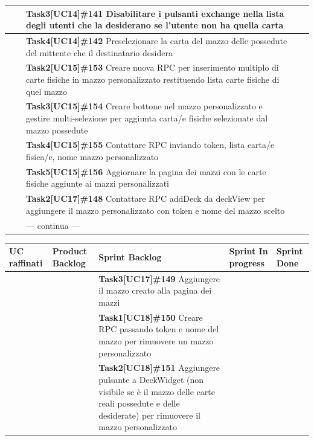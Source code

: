 \documentclass[a4paper, oneside]{article}
\begin{document}
\begin{landscape}
\begin{tabular}{ | p{6.5cm} | p{3cm} | p{8cm} | p{2.9cm} | p{2.4cm}| }
            & & \textbf{Task3[UC14]\#141} Disabilitare i pulsanti exchange nella lista degli utenti che la desiderano se l'utente non ha quella carta  & & \\ \hline
            & & \textbf{Task4[UC14]\#142} Preselezionare la carta del mazzo delle possedute del mittente che il destinatario desidera  & & \\ \hline
            & & \textbf{Task2[UC15]\#153} Creare nuova RPC per inserimento multiplo di carte fisiche in mazzo personalizzato restituendo lista carte fisiche di quel mazzo  & & \\ \hline
            & & \textbf{Task3[UC15]\#154} Creare bottone nel mazzo personalizzato e gestire multi-selezione per aggiunta carta/e fisiche selezionate dal mazzo possedute  & & \\ \hline
            & & \textbf{Task4[UC15]\#155} Contattare RPC inviando token, lista carta/e fisica/e, nome mazzo personalizzato  & & \\ \hline
            & & \textbf{Task5[UC15]\#156} Aggiornare la pagina dei mazzi con le carte fisiche aggiunte ai mazzi personalizzati  & & \\ \hline
            & & \textbf{Task2[UC17]\#148} Contattare RPC addDeck da deckView per aggiungere il mazzo personalizzato con token e nome del mazzo scelto  & & \\ \hline
            & & --- continua --- & & \\
            \hline
        \end{tabular}
        \newpage
        \small
        \noindent
        \def\arraystretch{2}%
        \begin{tabular}{ | p{6.5cm} | p{3cm} | p{8cm} | p{2.9cm} | p{2.4cm}| }
            \hline
            \textbf{UC raffinati}
            & \textbf{Product Backlog}
            & \textbf{Sprint Backlog}
            & \textbf{Sprint In progress}
            & \textbf{Sprint Done} \\
            \hline
            \hline
            & & \textbf{Task3[UC17]\#149} Aggiungere il mazzo creato alla pagina dei mazzi  & & \\ \hline
            & & \textbf{Task1[UC18]\#150} Creare RPC passando token e nome del mazzo per rimuovere un mazzo personalizzato  & & \\ \hline
            & & \textbf{Task2[UC18]\#151} Aggiungere pulsante a DeckWidget (non visibile se è il mazzo delle carte reali possedute e delle desiderate) per rimuovere il mazzo personalizzato  & & \\ \hline

\end{tabular}
\end{landscape}
\end{document}
